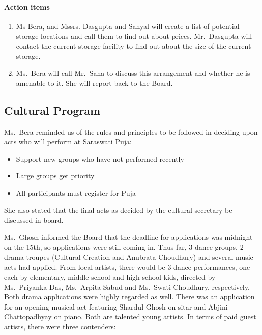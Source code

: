 \documentclass[12pt,]{article}
\providecommand{\tightlist}{%
  \setlength{\itemsep}{0pt}\setlength{\parskip}{0pt}}
\let\oldparagraph\paragraph
\renewcommand{\paragraph}[1]{\oldparagraph{#1}\mbox{}}
\begin{document}
\hypertarget{action-items-2}{%
\paragraph{Action items}\label{action-items-2}}

\begin{enumerate}
\def\labelenumi{\arabic{enumi}.}
\tightlist
\item
  Ms Bera, and Mssrs. Dasgupta and Sanyal will create a list of
  potential storage locations and call them to find out about prices.
  Mr.~Dasgupta will contact the current storage facility to find out
  about the size of the current storage.
\item
  Ms.~Bera will call Mr.~Saha to discuss this arrangement and whether he
  is amenable to it. She will report back to the Board.
\end{enumerate}

\hypertarget{cultural-program}{%
\subsection{Cultural Program}\label{cultural-program}}

Ms.~Bera reminded us of the rules and principles to be followed in
deciding upon acts who will perform at Saraswati Puja:

\begin{itemize}
\tightlist
\item
  Support new groups who have not performed recently
\item
  Large groups get priority
\item
  All participants must register for Puja
\end{itemize}

She also stated that the final acts as decided by the cultural secretary
be discussed in board.

Ms.~Ghosh informed the Board that the deadline for applications was
midnight on the 15th, so applications were still coming in. Thus far, 3
dance groups, 2 drama troupes (Cultural Creation and Anubrata Choudhury)
and several music acts had applied. From local artists, there would be 3
dance performances, one each by elementary, middle school and high
school kids, directed by Ms.~Priyanka Das, Ms.~Arpita Sabud and
Ms.~Swati Choudhury, respectively. Both drama applications were highly
regarded as well. There was an application for an opening musical act
featuring Shardul Ghosh on sitar and Abjini Chattopadhyay on piano. Both
are talented young artists. In terms of paid guest artists, there were
three contenders:
\end{document}
